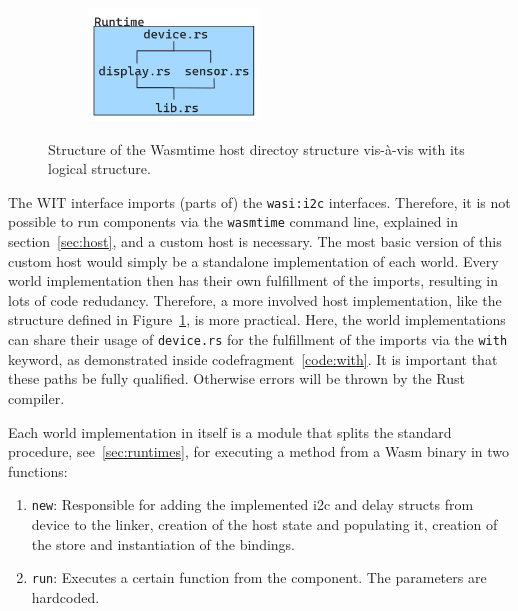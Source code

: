 \begin{figure}[h]
\begin{subfigure}{.5\textwidth}
\end{subfigure}%
\begin{subfigure}{.5\textwidth}
    \centering
    \includegraphics[width=0.5\textwidth]{figures/host.png}
\end{subfigure}
\caption{Structure of the Wasmtime host directoy structure vis-à-vis with its logical structure.}
\label{fig:host}
\end{figure}

The WIT interface imports (parts of) the \texttt{wasi:i2c} interfaces. Therefore, it is not possible to run components via the \texttt{wasmtime} command line, explained in section~\ref{sec:host}, and a custom host is necessary. The most basic version of this custom host would simply be a standalone implementation of each world. Every world implementation then has their own fulfillment of the imports, resulting in lots of code redudancy. Therefore, a more involved host implementation, like the structure defined in Figure~\ref{fig:host}, is more practical. Here, the world implementations can share their usage of \texttt{device.rs} for the fulfillment of the imports via the \texttt{with} keyword, as demonstrated inside codefragment~\ref{code:with}. It is important that these paths be fully qualified. Otherwise errors will be thrown by the Rust compiler. 

Each world implementation in itself is a module that splits the standard procedure, see~\ref{sec:runtimes}, for executing a method from a \gls{Wasm} binary in two functions:

\begin{enumerate}
  \item \texttt{new}: Responsible for adding the implemented i2c and delay structs from device to the linker, creation of the host state and populating it, creation of the store and instantiation of the bindings. 
  \item \texttt{run}: Executes a certain function from the component. The parameters are hardcoded.
\end{enumerate}

